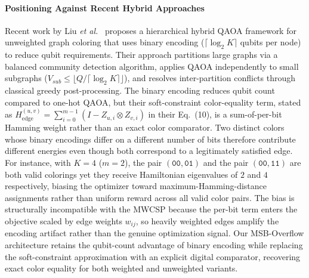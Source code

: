 \documentclass{ieeeaccess}
\begin{document}
\paragraph{Positioning Against Recent Hybrid Approaches}
Recent work by Liu \textit{et al.}~\cite{liu2025hybrid} proposes a hierarchical hybrid QAOA framework for unweighted graph coloring that uses binary encoding ($\lceil \log_2 K \rceil$ qubits per node) to reduce qubit requirements. Their approach partitions large graphs via a balanced community detection algorithm, applies QAOA independently to small subgraphs ($V_{sub} \le \lfloor Q / \lceil \log_2 K \rceil \rfloor$), and resolves inter-partition conflicts through classical greedy post-processing. The binary encoding reduces qubit count compared to one-hot QAOA, but their soft-constraint color-equality term, stated as $H_{\text{edge}}^{(u,v)} = \sum_{i=0}^{m-1} (I - Z_{u,i} \otimes Z_{v,i})$ in their Eq.~(10), is a sum-of-per-bit Hamming weight rather than an exact color comparator. Two distinct colors whose binary encodings differ on a different number of bits therefore contribute different energies even though both correspond to a legitimately satisfied edge. For instance, with $K = 4$ ($m = 2$), the pair $(\texttt{00},\texttt{01})$ and the pair $(\texttt{00},\texttt{11})$ are both valid colorings yet they receive Hamiltonian eigenvalues of $2$ and $4$ respectively, biasing the optimizer toward maximum-Hamming-distance assignments rather than uniform reward across all valid color pairs. The bias is structurally incompatible with the MWCSP because the per-bit term enters the objective scaled by edge weights $w_{ij}$, so heavily weighted edges amplify the encoding artifact rather than the genuine optimization signal. Our MSB-Overflow architecture retains the qubit-count advantage of binary encoding while replacing the soft-constraint approximation with an explicit digital comparator, recovering exact color equality for both weighted and unweighted variants.
\end{document}
